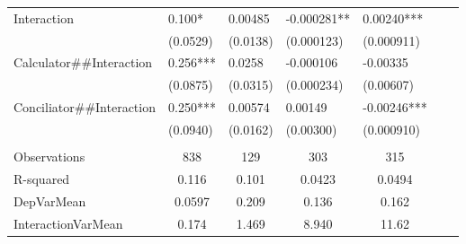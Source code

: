 \begin{tabular}{rrrrrrr}
\multicolumn{1}{l}{Interaction} & \multicolumn{1}{l}{0.100*} & \multicolumn{1}{l}{0.00485} & \multicolumn{1}{l}{-0.000281**} & \multicolumn{1}{l}{0.00240***} & \multicolumn{1}{l}{} & \multicolumn{1}{l}{} \\
\multicolumn{1}{l}{} & \multicolumn{1}{l}{(0.0529)} & \multicolumn{1}{l}{(0.0138)} & \multicolumn{1}{l}{(0.000123)} & \multicolumn{1}{l}{(0.000911)} & \multicolumn{1}{l}{} & \multicolumn{1}{l}{} \\
\multicolumn{1}{l}{Calculator\#\#Interaction} & \multicolumn{1}{l}{0.256***} & \multicolumn{1}{l}{0.0258} & \multicolumn{1}{l}{-0.000106} & \multicolumn{1}{l}{-0.00335} & \multicolumn{1}{l}{} & \multicolumn{1}{l}{} \\
\multicolumn{1}{l}{} & \multicolumn{1}{l}{(0.0875)} & \multicolumn{1}{l}{(0.0315)} & \multicolumn{1}{l}{(0.000234)} & \multicolumn{1}{l}{(0.00607)} & \multicolumn{1}{l}{} & \multicolumn{1}{l}{} \\
\multicolumn{1}{l}{Conciliator\#\#Interaction} & \multicolumn{1}{l}{0.250***} & \multicolumn{1}{l}{0.00574} & \multicolumn{1}{l}{0.00149} & \multicolumn{1}{l}{-0.00246***} & \multicolumn{1}{l}{} & \multicolumn{1}{l}{} \\
\multicolumn{1}{l}{} & \multicolumn{1}{l}{(0.0940)} & \multicolumn{1}{l}{(0.0162)} & \multicolumn{1}{l}{(0.00300)} & \multicolumn{1}{l}{(0.000910)} & \multicolumn{1}{l}{} & \multicolumn{1}{l}{} \\
\multicolumn{1}{l}{} & \multicolumn{1}{l}{} & \multicolumn{1}{l}{} & \multicolumn{1}{l}{} & \multicolumn{1}{l}{} & \multicolumn{1}{l}{} &  \\
\midrule
\multicolumn{1}{l}{Observations} & \multicolumn{1}{c}{838} & \multicolumn{1}{c}{129} & \multicolumn{1}{c}{303} & \multicolumn{1}{c}{315} & \multicolumn{1}{c}{} & \multicolumn{1}{c}{} \\
\multicolumn{1}{l}{R-squared} & \multicolumn{1}{c}{0.116} & \multicolumn{1}{c}{0.101} & \multicolumn{1}{c}{0.0423} & \multicolumn{1}{c}{0.0494} & \multicolumn{1}{c}{} & \multicolumn{1}{c}{} \\
\multicolumn{1}{l}{DepVarMean} & \multicolumn{1}{c}{0.0597} & \multicolumn{1}{c}{0.209} & \multicolumn{1}{c}{0.136} & \multicolumn{1}{c}{0.162} & \multicolumn{1}{c}{} & \multicolumn{1}{c}{} \\
\multicolumn{1}{l}{InteractionVarMean} & \multicolumn{1}{c}{0.174} & \multicolumn{1}{c}{1.469} & \multicolumn{1}{c}{8.940} & \multicolumn{1}{c}{11.62} & \multicolumn{1}{c}{} & \multicolumn{1}{c}{} \\

\end{tabular}
